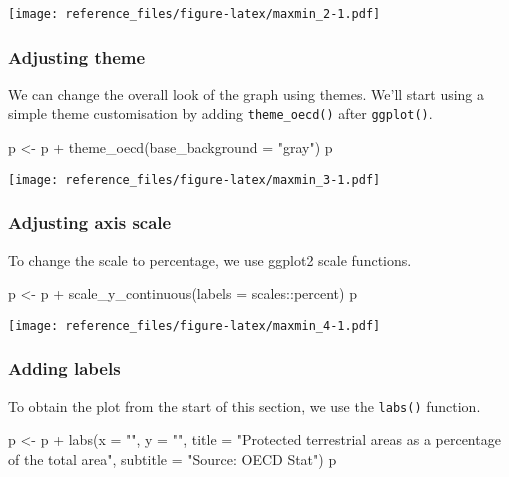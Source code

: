 \documentclass[
]{article}
\newenvironment{Shaded}{\begin{snugshade}}{\end{snugshade}}
\newcommand{\AttributeTok}[1]{\textcolor[rgb]{0.77,0.63,0.00}{#1}}
\newcommand{\FunctionTok}[1]{\textcolor[rgb]{0.00,0.00,0.00}{#1}}
\newcommand{\NormalTok}[1]{#1}
\newcommand{\OtherTok}[1]{\textcolor[rgb]{0.56,0.35,0.01}{#1}}
\newcommand{\SpecialCharTok}[1]{\textcolor[rgb]{0.00,0.00,0.00}{#1}}
\newcommand{\StringTok}[1]{\textcolor[rgb]{0.31,0.60,0.02}{#1}}
\begin{document}
\texttt{[image: reference\_files/figure-latex/maxmin\_2-1.pdf]}

\hypertarget{adjusting-theme-2}{%
\subsubsection{Adjusting theme}\label{adjusting-theme-2}}

We can change the overall look of the graph using themes. We'll start
using a simple theme customisation by adding \texttt{theme\_oecd()}
after \texttt{ggplot()}.

\begin{Shaded}
\begin{Highlighting}[]
\NormalTok{p }\OtherTok{\textless{}{-}}\NormalTok{ p }\SpecialCharTok{+} 
  \FunctionTok{theme\_oecd}\NormalTok{(}\AttributeTok{base\_background =} \StringTok{"gray"}\NormalTok{)}
\NormalTok{p}
\end{Highlighting}
\end{Shaded}

\texttt{[image: reference\_files/figure-latex/maxmin\_3-1.pdf]}

\hypertarget{adjusting-axis-scale-2}{%
\subsubsection{Adjusting axis scale}\label{adjusting-axis-scale-2}}

To change the scale to percentage, we use ggplot2 scale functions.

\begin{Shaded}
\begin{Highlighting}[]
\NormalTok{p }\OtherTok{\textless{}{-}}\NormalTok{ p }\SpecialCharTok{+}
  \FunctionTok{scale\_y\_continuous}\NormalTok{(}\AttributeTok{labels =}\NormalTok{ scales}\SpecialCharTok{::}\NormalTok{percent)}
\NormalTok{p}
\end{Highlighting}
\end{Shaded}

\texttt{[image: reference\_files/figure-latex/maxmin\_4-1.pdf]}

\hypertarget{adding-labels-2}{%
\subsubsection{Adding labels}\label{adding-labels-2}}

To obtain the plot from the start of this section, we use the
\texttt{labs()} function.

\begin{Shaded}
\begin{Highlighting}[]
\NormalTok{p }\OtherTok{\textless{}{-}}\NormalTok{ p }\SpecialCharTok{+}
  \FunctionTok{labs}\NormalTok{(}\AttributeTok{x =} \StringTok{""}\NormalTok{, }\AttributeTok{y =} \StringTok{""}\NormalTok{,}
       \AttributeTok{title =} \StringTok{"Protected terrestrial areas as a percentage of the total area"}\NormalTok{,}
       \AttributeTok{subtitle =} \StringTok{"Source: OECD Stat"}\NormalTok{)}
\NormalTok{p}
\end{Highlighting}
\end{Shaded}
\end{document}

